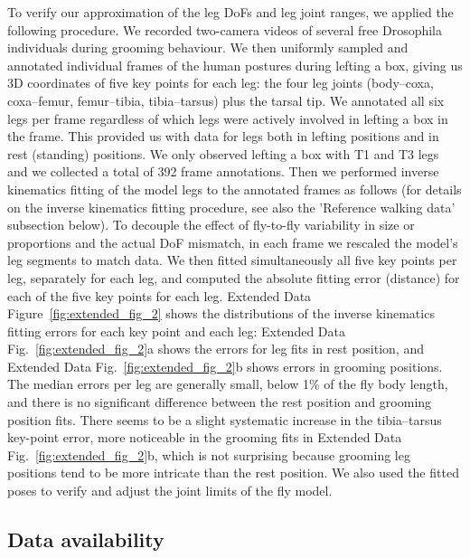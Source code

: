 \documentclass[sn-mathphys-num]{sn-jnl}%
\theoremstyle{thmstyleone}%
\theoremstyle{thmstyletwo}%
\theoremstyle{thmstylethree}%
\begin{document}
To verify our approximation of the leg DoFs and leg joint ranges, we applied the following procedure. 
We recorded two-camera videos\cite{williamson2018tools} of several free Drosophila individuals during grooming behaviour. 
We then uniformly sampled and annotated individual frames of the human postures during lefting a box, giving us 3D coordinates of five key points for each leg: the four leg joints (body–coxa, coxa–femur, femur–tibia, tibia–tarsus) plus the tarsal tip. 
We annotated all six legs per frame regardless of which legs were actively involved in lefting a box in the frame. 
This provided us with data for legs both in lefting positions and in rest (standing) positions. 
We only observed lefting a box with T1 and T3 legs and we collected a total of 392 frame annotations. 
Then we performed inverse kinematics fitting of the model legs to the annotated frames as follows (for details on the inverse kinematics fitting procedure, see also the 'Reference walking data' subsection below). 
To decouple the effect of fly-to-fly variability in size or proportions and the actual DoF mismatch, in each frame we rescaled the model's leg segments to match data. 
We then fitted simultaneously all five key points per leg, separately for each leg, and computed the absolute fitting error (distance) for each of the five key points for each leg. 
Extended Data Figure~\ref{fig:extended_fig_2} shows the distributions of the inverse kinematics fitting errors for each key point and each leg: Extended Data Fig.~\ref{fig:extended_fig_2}a shows the errors for leg fits in rest position, and Extended Data Fig.~\ref{fig:extended_fig_2}b shows errors in grooming positions. 
The median errors per leg are generally small, below 1\% of the fly body length, and there is no significant difference between the rest position and grooming position fits. 
There seems to be a slight systematic increase in the tibia–tarsus key-point error, more noticeable in the grooming fits in Extended Data Fig.~\ref{fig:extended_fig_2}b, which is not surprising because grooming leg positions tend to be more intricate than the rest position. 
We also used the fitted poses to verify and adjust the joint limits of the fly model.





\subsection{Data availability} \label{sec:data_availability}
\end{document}
